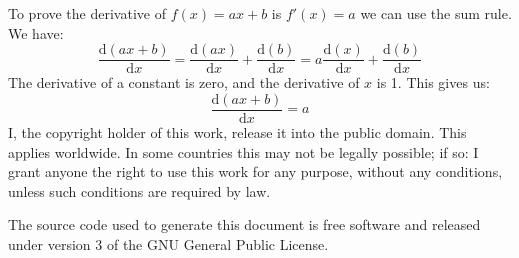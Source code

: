 \documentclass{article}
\theoremstyle{plain}
\begin{document}
    To prove the derivative of $f(x)=ax+b$ is $f'(x)=a$ we can use the sum
    rule. We have:
    \begin{equation}
        \frac{\textrm{d}(ax+b)}{\textrm{d}x}
            =\frac{\textrm{d}(ax)}{\textrm{d}x}+
                \frac{\textrm{d}(b)}{\textrm{d}x}
            =a\frac{\textrm{d}(x)}{\textrm{d}x}+
                \frac{\textrm{d}(b)}{\textrm{d}x}
    \end{equation}
    The derivative of a constant is zero, and the derivative of $x$ is 1.
    This gives us:
    \begin{equation}
        \frac{\textrm{d}(ax+b)}{\textrm{d}x}=a
    \end{equation}
    \newpage
    I, the copyright holder of this work, release it into the public domain.
    This applies worldwide. In some countries this may not be legally possible;
    if so: I grant anyone the right to use this work for any purpose, without
    any conditions, unless such conditions are required by law.
    \par\hfill\par
    The source code used to generate this document is free software and released
    under version 3 of the GNU General Public License.
\end{document}
